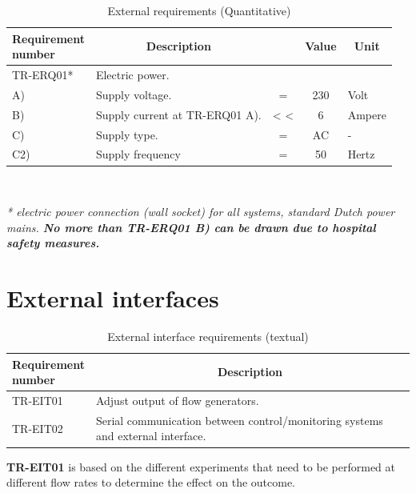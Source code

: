 \begin{table}[H]
\caption{External requirements (Quantitative)}
\label{tab:extreq_quan}
\begin{tabular}{l|p{65mm}ccp{20mm}|}
	\makecell[l]{\textbf{Requirement} \\  \textbf{number}} & \multicolumn{1}{c}{\textbf{Description}} & \multicolumn{1}{c}{ } & \multicolumn{1}{c}{\textbf{Value}} & \multicolumn{1}{c}{\textbf{Unit}} \\
	\hline	
	TR-ERQ01* &  Electric power. &  &  &  \\
	\hspace{1.5cm} A) & Supply voltage. 	& = 	& 230 	& Volt \\
	\hspace{1.5cm} B) & Supply current at TR-ERQ01 A). 	& < < 	& 6		& Ampere \\
	\hspace{1.5cm} C) & Supply type. 		& = 	& AC 	& - \\
	\hspace{1.5cm} C2) & Supply frequency	& =		& 50	& Hertz \\
	\cline{2-5}
\end{tabular} \\
\raggedright
\textit{* electric power connection (wall socket) for all systems, standard Dutch power mains. \textbf{No more than TR-ERQ01 B) can be drawn due to hospital safety measures.}}
\end{table}

\section{External interfaces}
\begin{table} [H]
\caption{External interface requirements (textual)}
\label{tab:extint_text}
\begin{tabular}{l|p{120mm}|}
	\makecell[l]{\textbf{Requirement} \\ \textbf{number}} & \multicolumn{1}{c}{\textbf{Description}}\\
	\hline
	TR-EIT01 & Adjust output of flow generators. \\
	TR-EIT02 & Serial communication between control/monitoring systems and external interface.\\
	\cline{2-2}
\end{tabular}
\end{table}

\textbf{TR-EIT01} is based on the different experiments that need to be performed at different flow rates to determine the effect on the outcome.

